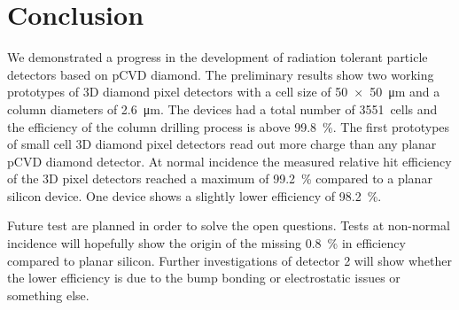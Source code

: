 \section{Conclusion}
We demonstrated a progress in the development of radiation tolerant particle detectors based on \ac{pCVD} diamond. The preliminary results show two working prototypes of 3D diamond pixel detectors with a cell size of \SI{50x50}{\um} and a column diameters of \SI{2.6}{\um}. The devices had a total number of \SI{3551}{cells} and the efficiency of the column drilling process is above \SI{99.8}{\%}. The first prototypes of small cell 3D diamond pixel detectors read out more charge than any planar \ac{pCVD} diamond detector. At normal incidence the measured relative hit efficiency of the 3D pixel detectors reached a maximum of \SI{99.2}{\%} compared to a planar silicon device. One device shows a slightly lower efficiency of \SI{98.2}{\%}.\par
Future test are planned in order to solve the open questions. Tests at non-normal incidence will hopefully show the origin of the missing \SI{.8}{\%} in efficiency compared to planar silicon. Further investigations of detector 2 will show whether the lower efficiency is due to the bump bonding or electrostatic issues or something else.